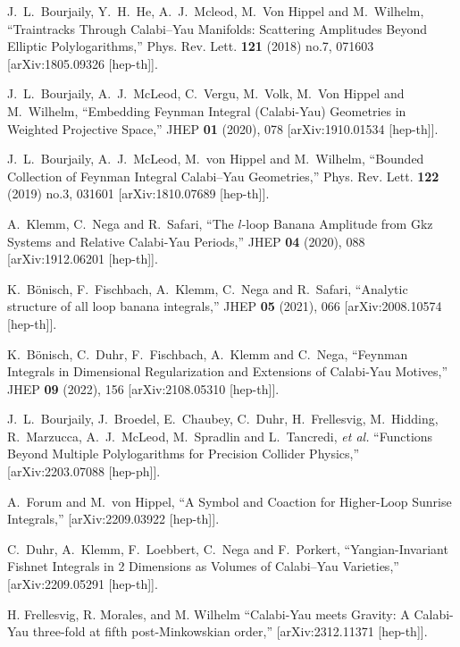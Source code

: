 \documentclass[a4paper,12pt]{article}
\numberwithin{equation}{section}
\numberwithin{figure}{section}
\begin{document}
\begin{thebibliography}{99}
J.~L.~Bourjaily, Y.~H.~He, A.~J.~Mcleod, M.~Von Hippel and M.~Wilhelm,
``Traintracks Through Calabi--Yau Manifolds: Scattering Amplitudes Beyond Elliptic Polylogarithms,''
Phys. Rev. Lett. \textbf{121} (2018) no.7, 071603
[arXiv:1805.09326 [hep-th]].
  

J.~L.~Bourjaily, A.~J.~McLeod, C.~Vergu, M.~Volk, M.~Von Hippel and M.~Wilhelm,
``Embedding Feynman Integral (Calabi-Yau) Geometries in Weighted Projective Space,''
JHEP \textbf{01} (2020), 078
[arXiv:1910.01534 [hep-th]].

J.~L.~Bourjaily, A.~J.~McLeod, M.~von Hippel and M.~Wilhelm,
``Bounded Collection of Feynman Integral Calabi--Yau Geometries,''
Phys. Rev. Lett. \textbf{122} (2019) no.3, 031601
[arXiv:1810.07689 [hep-th]].

A.~Klemm, C.~Nega and R.~Safari,
``The $l$-loop Banana Amplitude from Gkz Systems and Relative Calabi-Yau Periods,''
JHEP \textbf{04} (2020), 088
[arXiv:1912.06201 [hep-th]].

K.~B\"onisch, F.~Fischbach, A.~Klemm, C.~Nega and R.~Safari,
``Analytic structure of all loop banana integrals,''
JHEP \textbf{05} (2021), 066
[arXiv:2008.10574 [hep-th]].


K.~B\"onisch, C.~Duhr, F.~Fischbach, A.~Klemm and C.~Nega,
``Feynman Integrals in Dimensional Regularization and Extensions of Calabi-Yau Motives,''
JHEP \textbf{09} (2022), 156
[arXiv:2108.05310 [hep-th]].

J.~L.~Bourjaily, J.~Broedel, E.~Chaubey, C.~Duhr, H.~Frellesvig, M.~Hidding, R.~Marzucca, A.~J.~McLeod, M.~Spradlin and L.~Tancredi, \textit{et al.}
``Functions Beyond Multiple Polylogarithms for Precision Collider Physics,''
[arXiv:2203.07088 [hep-ph]].


A.~Forum and M.~von Hippel,
``A Symbol and Coaction for Higher-Loop Sunrise Integrals,''
[arXiv:2209.03922 [hep-th]].

C.~Duhr, A.~Klemm, F.~Loebbert, C.~Nega and F.~Porkert,
``Yangian-Invariant Fishnet Integrals in 2 Dimensions as Volumes of Calabi--Yau Varieties,''
[arXiv:2209.05291 [hep-th]].

H. Frellesvig, R. Morales, and M. Wilhelm
``Calabi-Yau meets Gravity: A Calabi-Yau three-fold at fifth post-Minkowskian order,''
[arXiv:2312.11371 [hep-th]].



\end{thebibliography}
\end{document}

